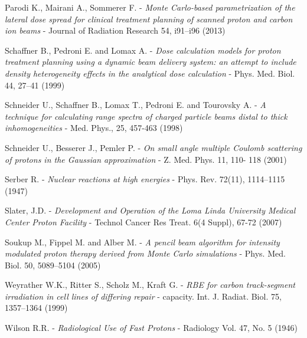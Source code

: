 \documentclass[12pt, a4paper, twoside]{book}
\begin{document}
\begin{thebibliography}{99}
Parodi K., Mairani A., Sommerer F. -
\emph{Monte Carlo-based parametrization of the lateral dose spread for clinical treatment planning of scanned proton and carbon ion beams} -
Journal of Radiation Research 54, i91–i96 (2013)

Schaffner B., Pedroni E. and Lomax A. -
\emph{Dose calculation models for proton treatment planning using a dynamic beam delivery system: an attempt to include density heterogeneity effects in the analytical dose calculation} - 
Phys. Med. Biol. 44, 27–41 (1999)

Schneider U.,  Schaffner B., Lomax T., Pedroni E. and Tourovsky A. -
\emph{A technique for calculating range spectra of charged particle beams distal to thick inhomogeneities} -
Med. Phys., 25, 457-463 (1998)

Schneider U., Besserer J., Pemler P. - 
\emph{On small angle multiple Coulomb scattering of protons in the Gaussian approximation} - 
Z. Med. Phys. 11,  110- 118 (2001)

Serber R. - 
\emph{Nuclear reactions at high energies} -
Phys. Rev. 72(11), 1114–1115 (1947)

Slater, J.D. -
\emph{Development and Operation of the Loma Linda University Medical Center Proton Facility} -
Technol Cancer Res Treat. 6(4 Suppl), 67-72 (2007)

Soukup M., Fippel M. and Alber M. -
\emph{A pencil beam algorithm for intensity modulated proton therapy derived from Monte Carlo simulations} -
Phys. Med. Biol. 50, 5089–5104 (2005)


Weyrather W.K., Ritter S., Scholz M., Kraft G. - 
\emph{RBE for carbon track-segment irradiation in cell lines of differing repair} -
capacity. Int. J. Radiat. Biol. 75, 1357–1364 (1999)

Wilson R.R. -
\emph{Radiological Use of Fast Protons} -
Radiology Vol. 47, No. 5 (1946)






\end{thebibliography}




\end{document}
